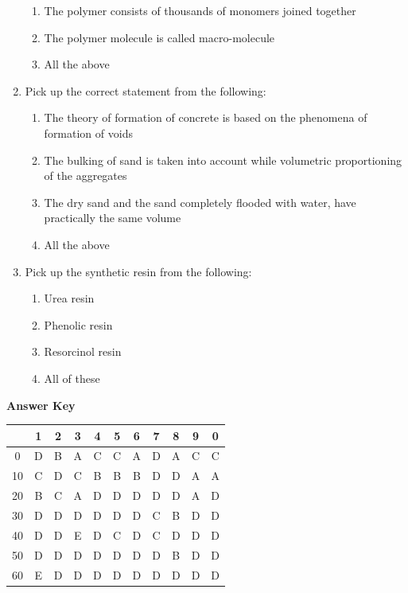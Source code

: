 \documentclass[11pt,a4paper]{article}
\begin{document}
\begin{enumerate}
\begin{enumerate}[label=\Alph*.]
\item{The polymer consists of thousands of monomers joined together}
\item{The polymer molecule is called macro-molecule}
\item{All the above}
\end{enumerate}
\item{Pick up the correct statement from the following:}
\begin{enumerate}[label=\Alph*.]
\item{The theory of formation of concrete is based on the phenomena of formation of voids}
\item{The bulking of sand is taken into account while volumetric proportioning of the aggregates}
\item{The dry sand and the sand completely flooded with water, have practically the same volume}
\item{All the above}
\end{enumerate}
\item{Pick up the synthetic resin from the following:}
\begin{enumerate}[label=\Alph*.]
\item{Urea resin}
\item{Phenolic resin}
\item{Resorcinol resin}
\item{All of these}
\end{enumerate}
\end{enumerate}
\textbf{Answer Key}
\begin{tabular}{ | c | c c c c c c c c c c | }
\hline
 & 1 & 2 & 3 & 4 & 5 & 6 & 7 & 8 & 9 & 0 \\
\hline
0 & D & B & A & C & C & A & D & A & C & C \\
10 & C & D & C & B & B & B & D & D & A & A \\
20 & B & C & A & D & D & D & D & D & A & D \\
30 & D & D & D & D & D & D & C & B & D & D \\
40 & D & D & E & D & C & D & C & D & D & D \\
50 & D & D & D & D & D & D & D & B & D & D \\
60 & E & D & D & D & D & D & D & D & D & D \\
\hline
\end{tabular}
\clearpage
\end{document}
